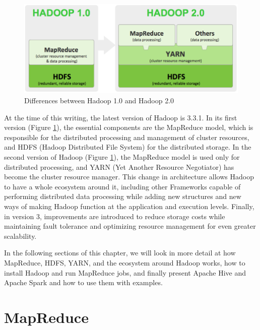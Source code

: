 \documentclass[12pt,english]{book}
\begin{document}
\begin{figure}[ht]
\centering
\includegraphics[width=\linewidth]{hadoop1vshadoop2}
\caption[Differences between Hadoop 1.0 and Hadoop 2.0]{Differences between Hadoop 1.0 and Hadoop 2.0 \footnotemark}
\label{fig:differenceBetweenHadoop1and2}
\end{figure}

At the time of this writing, the latest version of Hadoop is 3.3.1.
In its first version (Figure \ref{fig:differenceBetweenHadoop1and2}), the essential components are the MapReduce model, which is responsible for the distributed processing and management of cluster resources, and HDFS (Hadoop Distributed File System) for the distributed storage.
In the second version of Hadoop (Figure \ref{fig:differenceBetweenHadoop1and2}), the MapReduce model is used only for distributed processing, and YARN (Yet Another Resource Negotiator) has become the cluster resource manager.
This change in architecture allows Hadoop to have a whole ecosystem around it, including other Frameworks capable of performing distributed data processing while adding new structures and new ways of making Hadoop function at the application and execution levels.
Finally, in version 3, improvements are introduced to reduce storage costs while maintaining fault tolerance and optimizing resource management for even greater scalability.

In the following sections of this chapter, we will look in more detail at how MapReduce, HDFS, YARN, and the ecosystem around Hadoop works, how to install Hadoop and run MapReduce jobs, and finally present Apache Hive and Apache Spark and how to use them with examples.


\section{MapReduce}
\end{document}
